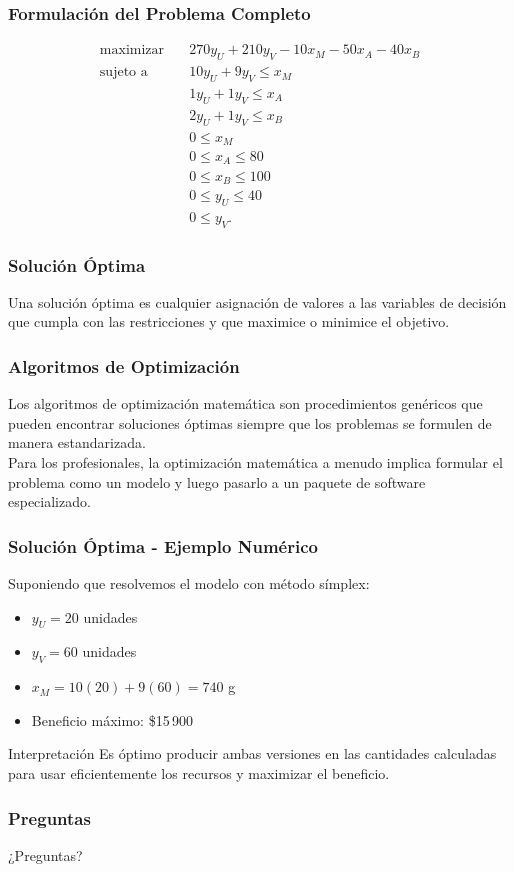 \documentclass{beamer}
\begin{document}
\begin{frame}
\frametitle{Formulación del Problema Completo}
$$
\begin{align}
\text{maximizar} \quad & 270 y_U + 210 y_V - 10 x_M - 50 x_A - 40 x_B \\
\text{sujeto a} \quad & 10 y_U + 9 y_V \leq x_M \nonumber \\
 & 1 y_U + 1 y_V \leq x_A \nonumber \\
 & 2 y_U + 1 y_V \leq x_B \nonumber \\
 & 0 \leq x_M \nonumber \\
 & 0 \leq x_A \leq 80 \nonumber \\
 & 0 \leq x_B \leq 100 \nonumber \\
 & 0 \leq y_U \leq 40 \nonumber \\
 & 0 \leq y_V. \nonumber
\end{align}
$$
\end{frame}

\begin{frame}
\frametitle{Solución Óptima}
Una solución óptima es cualquier asignación de valores a las variables de decisión que cumpla con las restricciones y que maximice o minimice el objetivo.
\end{frame}

\begin{frame}
\frametitle{Algoritmos de Optimización}
Los algoritmos de optimización matemática son procedimientos genéricos que pueden encontrar soluciones óptimas siempre que los problemas se formulen de manera estandarizada.\\

Para los profesionales, la optimización matemática a menudo implica formular el problema como un modelo y luego pasarlo a un paquete de software especializado.
\end{frame}

\begin{frame}
\frametitle{Solución Óptima - Ejemplo Numérico}
Suponiendo que resolvemos el modelo con método símplex:
\pause
\begin{itemize}
    \item $y_U = 20$ unidades \pause
    \item $y_V = 60$ unidades \pause
    \item $x_M = 10(20) + 9(60) = 740$ g \pause
    \item Beneficio máximo: \$15\,900
\end{itemize}
\pause
\begin{block}{Interpretación}
Es óptimo producir ambas versiones en las cantidades calculadas para usar eficientemente los recursos y maximizar el beneficio.
\end{block}
\end{frame}

\begin{frame}
\frametitle{Preguntas}
\centering
\Huge{¿Preguntas?}
\end{frame}
\end{document}
